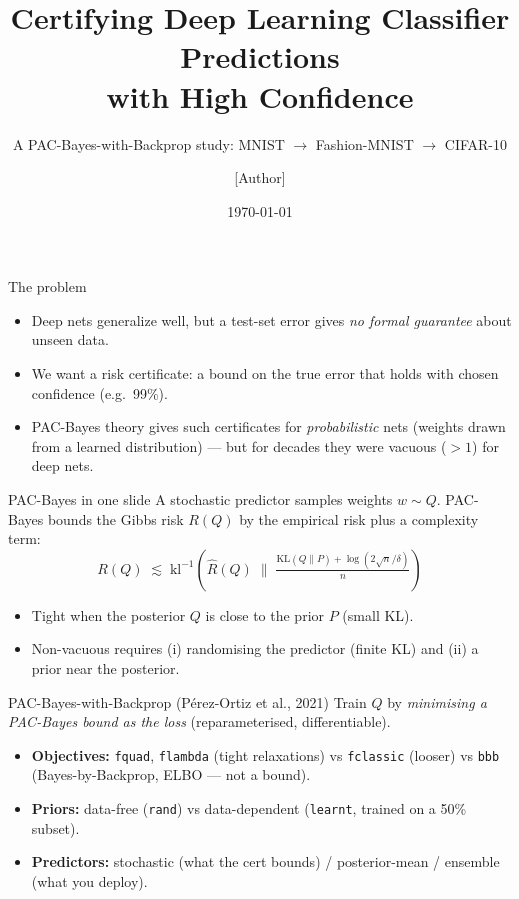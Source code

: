 \documentclass[aspectratio=169]{beamer}
\title{Certifying Deep Learning Classifier Predictions\\with High Confidence}
\subtitle{A PAC-Bayes-with-Backprop study: MNIST \(\to\) Fashion-MNIST \(\to\) CIFAR-10}
\author{[Author]}
\institute{MSc Project, Department of Electrical \& Electronic Engineering}
\date{\today}
\begin{document}
\begin{frame}\titlepage\end{frame}

\begin{frame}{The problem}
\begin{itemize}
  \item Deep nets generalize well, but a test-set error gives \emph{no formal guarantee} about unseen data.
  \item We want a \alert{risk certificate}: a bound on the true error that holds with chosen confidence (e.g.\ 99\%).
  \item PAC-Bayes theory gives such certificates for \emph{probabilistic} nets (weights drawn from a learned distribution) --- but for decades they were \alert{vacuous} ($>1$) for deep nets.
\end{itemize}
\end{frame}

\begin{frame}{PAC-Bayes in one slide}
A stochastic predictor samples weights \(w\sim Q\). PAC-Bayes bounds the Gibbs risk \(R(Q)\) by the empirical risk plus a complexity term:
\[
R(Q)\;\lesssim\;\mathrm{kl}^{-1}\!\left(\hat R(Q)\;\Big\|\;\tfrac{\mathrm{KL}(Q\|P)+\log(2\sqrt n/\delta)}{n}\right)
\]
\begin{itemize}
  \item Tight when the posterior \(Q\) is \alert{close to the prior} \(P\) (small KL).
  \item \alert{Non-vacuous} requires (i) randomising the predictor (finite KL) and (ii) a prior near the posterior.
\end{itemize}
\end{frame}

\begin{frame}{PAC-Bayes-with-Backprop (P\'erez-Ortiz et al., 2021)}
Train \(Q\) by \emph{minimising a PAC-Bayes bound as the loss} (reparameterised, differentiable).
\begin{itemize}
  \item \textbf{Objectives:} \texttt{fquad}, \texttt{flambda} (tight relaxations) vs \texttt{fclassic} (looser) vs \texttt{bbb} (Bayes-by-Backprop, ELBO --- not a bound).
  \item \textbf{Priors:} data-free (\texttt{rand}) vs data-dependent (\texttt{learnt}, trained on a 50\% subset).
  \item \textbf{Predictors:} stochastic (what the cert bounds) / posterior-mean / ensemble (what you deploy).
\end{itemize}
\end{frame}
\end{document}
